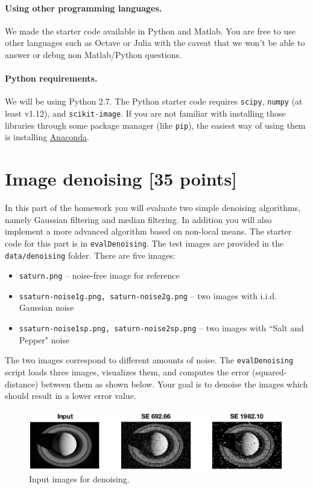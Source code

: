 \documentclass[10pt,letterpaper]{article}
\newcommand{\cmd}[1] {{\color{blue}\texttt{#1}}}
\begin{document}
\paragraph{Using other programming languages.} We made the starter code available in Python and Matlab. You are free to use other languages such as Octave or Julia with the caveat that we won't be able to answer or debug non Matlab/Python questions.

\paragraph{Python requirements.} We will be using Python 2.7. The Python starter code requires \cmd{scipy}, \cmd{numpy} (at least v1.12), and \cmd{scikit-image}.
If you are not familiar with installing those libraries through some package manager (like \cmd{pip}), the easiest way of using them is installing \href{https://conda.io/docs/user-guide/install/index.html}{Anaconda}.


\newpage

\section{Image denoising [35 points]}
In this part of the homework you will evaluate two simple denoising algorithms, namely Gaussian filtering and median filtering. In addition you will also implement a more advanced algorithm based on non-local means. The starter code for this part is in \cmd{evalDenoising}. The test images are provided in the \cmd{data/denoising} folder. There are five images:
\begin{itemize}
\item \texttt{saturn.png} -- noise-free image for reference
\item \texttt{ssaturn-noise1g.png, saturn-noise2g.png}  -- two images with i.i.d. Gaussian noise 
\item \texttt{ssaturn-noise1sp.png, saturn-noise2sp.png}  -- two images with ``Salt and Pepper" noise
\end{itemize}
The two images correspond to different amounts of noise. The \cmd{evalDenoising} script loads three images, visualizes them, and computes the error (squared-distance) between them as shown below. Your goal is to denoise the images which should result in a lower error value. 

\begin{figure}[h]
\centering
\includegraphics[width=0.8\linewidth]{denoising-output.png}
\caption{\label{fig:denoising} Input images for denoising.}
\end{figure}
\end{document}
